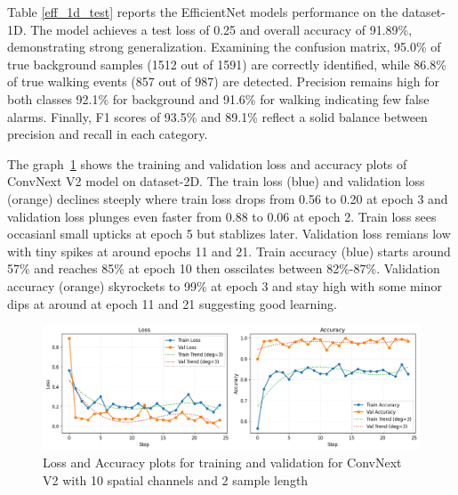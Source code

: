 Table \ref{eff_1d_test} reports the EfficientNet models performance on the dataset-1D. The model achieves a test loss of 0.25 and overall accuracy of 91.89\%, demonstrating strong generalization. Examining the confusion matrix, 95.0\% of true background samples (1512 out of 1591) are correctly identified, while 86.8\% of true walking events (857 out of 987) are detected. Precision remains high for both classes 92.1\% for background and 91.6\% for walking indicating few false alarms. Finally, F1 scores of 93.5\% and 89.1\% reflect a solid balance between precision and recall in each category.

The graph~\ref{conv_2d_train} shows the training and validation loss and accuracy plots of ConvNext V2 model on dataset-2D. The train loss (blue) and validation loss (orange) declines steeply where train loss drops from 0.56 to 0.20 at epoch 3 and validation loss plunges even faster from 0.88 to 0.06 at epoch 2. Train loss sees occasianl small upticks at epoch 5 but stablizes later. Validation loss remians low with tiny spikes at around epochs 11 and 21. Train accuracy (blue) starts around 57\% and reaches 85\% at epoch 10 then osscilates between 82\%-87\%. Validation accuracy (orange) skyrockets to 99\% at epoch 3 and stay high with some minor dips at around at epoch 11 and 21 suggesting good learning. 

\begin{figure}[h]
    \centering
    \includegraphics[width=\linewidth]{Bilder/jpg/conv_2d_train.png}
    \caption{Loss and Accuracy plots for training and validation for ConvNext V2 with 10 spatial channels and 2 sample length}
    \label{conv_2d_train}
\end{figure}

